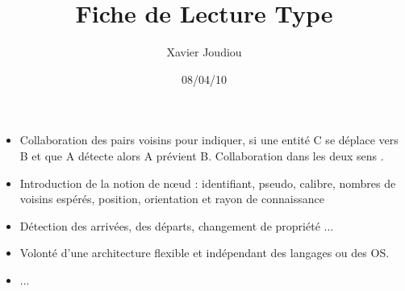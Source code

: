 \documentclass[11pt,a4paper]{article}
\title{Fiche de Lecture Type}
\author{Xavier Joudiou}
\date{08/04/10}
\begin{document}
	
  \begin{itemize}
  \renewcommand{\labelitemi}{$\Rightarrow$}
	\item Collaboration des pairs voisins pour indiquer, si une entité C se déplace vers B et que A détecte alors A prévient B. Collaboration dans les deux sens .
	\item Introduction de la notion de nœud : identifiant, pseudo, calibre, nombres de voisins espérés, position, orientation et rayon de connaissance
	\item Détection des arrivées, des départs, changement de propriété ...
	\item Volonté d'une architecture flexible et indépendant des langages ou des OS.
	\item ...
  \end{itemize}
\end{document}
